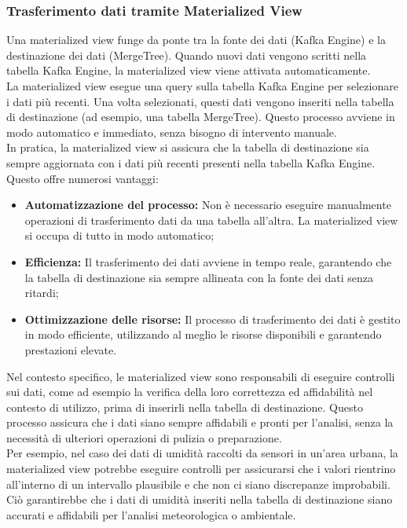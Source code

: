 \subsubsection{Trasferimento dati tramite Materialized View} \label{sec:materializedView}
Una materialized view funge da ponte tra la fonte dei dati (Kafka Engine) e la destinazione dei dati (MergeTree). Quando nuovi dati vengono scritti nella tabella Kafka Engine, la materialized view viene attivata automaticamente.\\
La materialized view esegue una query sulla tabella Kafka Engine per selezionare i dati più recenti. Una volta selezionati, questi dati vengono inseriti nella tabella di destinazione (ad esempio, una tabella MergeTree). Questo processo avviene in modo automatico e immediato, senza bisogno di intervento manuale.\\
In pratica, la materialized view si assicura che la tabella di destinazione sia sempre aggiornata con i dati più recenti presenti nella tabella Kafka Engine. Questo offre numerosi vantaggi:
\begin{itemize}
  \item \textbf{Automatizzazione del processo:} Non è necessario eseguire manualmente operazioni di trasferimento dati da una tabella all'altra. La materialized view si occupa di tutto in modo automatico;
  \item \textbf{Efficienza:} Il trasferimento dei dati avviene in tempo reale, garantendo che la tabella di destinazione sia sempre allineata con la fonte dei dati senza ritardi;
  \item \textbf{Ottimizzazione delle risorse:} Il processo di trasferimento dei dati è gestito in modo efficiente, utilizzando al meglio le risorse disponibili e garantendo prestazioni elevate.
\end{itemize}
Nel contesto specifico, le materialized view sono responsabili di eseguire controlli sui dati, come ad esempio la verifica della loro correttezza ed affidabilità nel contesto di utilizzo, prima di inserirli nella tabella di destinazione. Questo processo assicura che i dati siano sempre affidabili e pronti per l'analisi, senza la necessità di ulteriori operazioni di pulizia o preparazione.\\
Per esempio, nel caso dei dati di umidità raccolti da sensori in un'area urbana, la materialized view potrebbe eseguire controlli per assicurarsi che i valori rientrino all'interno di un intervallo plausibile e che non ci siano discrepanze improbabili. Ciò garantirebbe che i dati di umidità inseriti nella tabella di destinazione siano accurati e affidabili per l'analisi meteorologica o ambientale.


